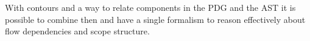 With contours and a way to relate components in the PDG and the AST it is possible to combine then and have a single formalism to reason effectively about flow dependencies and scope structure.

